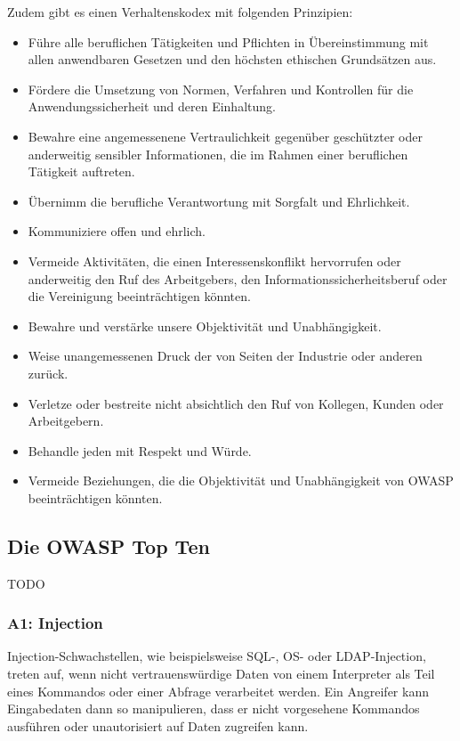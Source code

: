 \documentclass[12pt,oneside,a4paper,parskip]{scrbook}
\begin{document}
  Zudem gibt es einen Verhaltenskodex mit folgenden Prinzipien:
  \begin{itemize}
    \item Führe alle beruflichen Tätigkeiten und Pflichten in Übereinstimmung mit allen anwendbaren Gesetzen und den höchsten ethischen Grundsätzen aus.
    \item Fördere die Umsetzung von Normen, Verfahren und Kontrollen für die Anwendungssicherheit und deren Einhaltung.
    \item Bewahre eine angemessenene Vertraulichkeit gegenüber geschützter oder anderweitig sensibler Informationen, die im Rahmen einer beruflichen Tätigkeit auftreten.
    \item Übernimm die berufliche Verantwortung mit Sorgfalt und Ehrlichkeit.
    \item Kommuniziere offen und ehrlich.
    \item Vermeide Aktivitäten, die einen Interessenskonflikt hervorrufen oder anderweitig den Ruf des Arbeitgebers, den Informationssicherheitsberuf oder die Vereinigung beeinträchtigen könnten.
    \item Bewahre und verstärke unsere Objektivität und Unabhängigkeit.
    \item Weise unangemessenen Druck der von Seiten der Industrie oder anderen zurück.
    \item Verletze oder bestreite nicht absichtlich den Ruf von Kollegen, Kunden oder Arbeitgebern.
    \item Behandle jeden mit Respekt und Würde.
    \item Vermeide Beziehungen, die die Objektivität und Unabhängigkeit von OWASP  beeinträchtigen könnten.
  \end{itemize}

\cite{OWASPabout}

    \subsection{Die OWASP Top Ten}
    TODO
\cite{OWASPtop10}

    \subsubsection{A1: Injection}
    Injection-Schwachstellen, wie beispielsweise SQL-, OS- oder LDAP-Injection, treten auf, wenn
    nicht vertrauenswürdige Daten von einem Interpreter als Teil eines Kommandos oder einer
    Abfrage verarbeitet werden. Ein Angreifer kann Eingabedaten dann so manipulieren, dass er nicht
    vorgesehene Kommandos ausführen oder unautorisiert auf Daten zugreifen kann.
\end{document}
